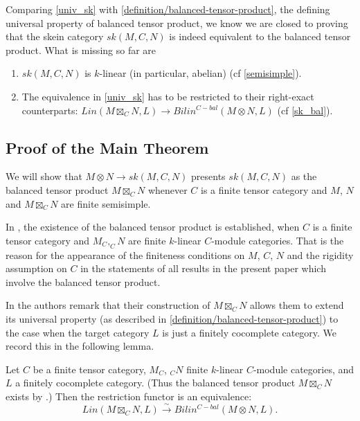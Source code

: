 \begin{remark}
  Comparing \ref{univ_sk} with \ref{definition/balanced-tensor-product}, the
  defining universal property of balanced tensor product, we know we are
  closed to proving that the skein category $sk(M,C,N)$ is indeed equivalent
  to the balanced tensor product. What is missing so far are

  \begin{enumerate}
    \item $sk(M,C,N)$ is $k$-linear (in particular, abelian) (cf \ref{semisimple}).
    \item The equivalence in \ref{univ_sk} has to be restricted to their
          right-exact counterparts:
          $Lin(M \boxtimes_{C} N, L) \to Bilin^{C-bal}(M \otimes N, L)$ (cf \ref{sk_bal}).
  \end{enumerate}
\end{remark}

\subsection{Proof of the Main Theorem}

We will show that $M\otimes N\to sk(M,C,N)$ presents $sk(M,C,N)$ as the
balanced tensor product $M\boxtimes_C N$ whenever $C$ is a finite tensor category 
and $M$, $N$ and $M\boxtimes_C N$ are finite semisimple.

\begin{remark} In \cite{douglas/balanced-product}, the existence of the balanced tensor
product is established, when $C$ is a finite tensor category and $M_C,_{C}N$ 
are finite $k$-linear $C$-module categories. That is the reason for the appearance of the finiteness conditions
on $M$, $C$, $N$ and the rigidity assumption on $C$ in the statements of all results in
the present paper which involve the balanced tensor product.\end{remark}

In \cite{douglas/balanced-product} the authors remark that their construction of $M\boxtimes_C N$ 
allows them to extend its universal property (as described in \ref{definition/balanced-tensor-product})
to the case when the target category $L$ is just a finitely cocomplete category.
We record this in the following lemma.

\begin{lemma}\label{univ_box}

  \noindent
  Let $C$ be a finite tensor category, $M_C$, $_{C}N$ finite $k$-linear
  $C$-module categories, and $L$ a finitely cocomplete category. (Thus the
  balanced tensor product $M \boxtimes_C N$ exists by
  \cite{douglas/balanced-product}.) Then the restriction functor is an
  equivalence:
  \[Lin(M \boxtimes_{C} N, L) \xrightarrow{\sim} Bilin^{C-bal}(M \otimes N, L).\]
\end{lemma}

